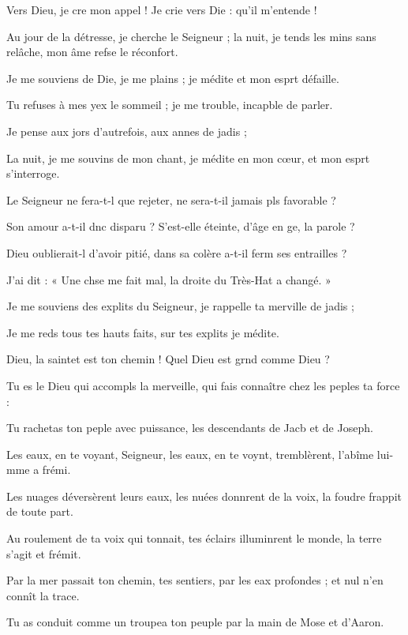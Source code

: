 \item Vers Dieu, je cre mon appel ! Je crie vers Die : qu’il m’entende !
\item Au jour de la détresse, je cherche le Seigneur ; la nuit, je tends les mins sans relâche, mon âme refse le réconfort.
\item Je me souviens de Die, je me plains ; je médite et mon esprt défaille.
\item Tu refuses à mes yex le sommeil ; je me trouble, incapble de parler.
\item Je pense aux jors d’autrefois, aux annes de jadis ;
\item La nuit, je me souvins de mon chant, je médite en mon cœur, et mon esprt s’interroge.
\item Le Seigneur ne fera-t-l que rejeter, ne sera-t-il jamais pls favorable ?
\item Son amour a-t-il dnc disparu ? S’est-elle éteinte, d’âge en ge, la parole ?
\item Dieu oublierait-l d’avoir pitié, dans sa colère a-t-il ferm ses entrailles ?
\item J’ai dit : « Une chse me fait mal, la droite du Très-Hat a changé. »
\item Je me souviens des explits du Seigneur, je rappelle ta merville de jadis ;
\item Je me reds tous tes hauts faits, sur tes explits je médite.
\item Dieu, la saintet est ton chemin ! Quel Dieu est grnd comme Dieu ?
\item Tu es le Dieu qui accompls la merveille, qui fais connaître chez les peples ta force :
\item Tu rachetas ton peple avec puissance, les descendants de Jacb et de Joseph.
\item Les eaux, en te voyant, Seigneur, les eaux, en te voynt, tremblèrent, l’abîme lui-mme a frémi.
\item Les nuages déversèrent leurs eaux, les nuées donnrent de la voix, la foudre frappit de toute part.
\item Au roulement de ta voix qui tonnait, tes éclairs illuminrent le monde, la terre s’agit et frémit.
\item Par la mer passait ton chemin, tes sentiers, par les eax profondes ; et nul n’en connît la trace.
\item Tu as conduit comme un troupea ton peuple par la main de Mose et d’Aaron.